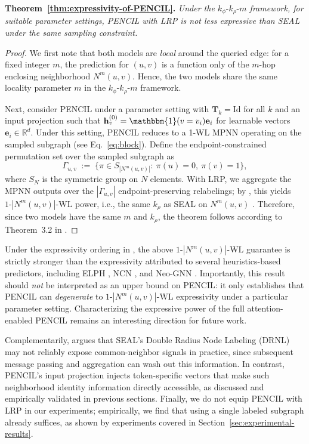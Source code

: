 \documentclass{article}
\theoremstyle{plain}
\theoremstyle{definition}
\theoremstyle{remark}
\begin{document}
\textbf{Theorem~\ref{thm:expressivity-of-PENCIL}.} \textit{
    Under the \(k_\phi\text{-}k_\rho\text{-}m\) framework, for suitable parameter settings, PENCIL with LRP is not less expressive than SEAL under the same sampling constraint.}
\begin{proof}
    We first note that both models are \emph{local} around the queried edge: for a fixed integer \(m\), the prediction for \((u,v)\) is a function only of the \(m\)-hop enclosing neighborhood \(N^m(u,v)\). Hence, the two models share the same locality parameter \(m\) in the \(k_\phi\text{-}k_\rho\text{-}m\) framework.
    
    Next, consider PENCIL under a parameter setting with \(\mathbf{T}_k=\mathrm{Id}\) for all \(k\) and an input projection such that
    \(\mathbf{h}_v^{(0)}=\mathbbm{1}(v=v_i)\mathbf{e}_i\) for learnable vectors \(\mathbf{e}_i\in\mathbb{R}^d\). Under this setting, PENCIL reduces to a 1-WL MPNN operating on the sampled subgraph (see Eq.~\ref{eq:block}). Define the endpoint-constrained permutation set over the sampled subgraph as
    \[
    \Gamma_{u,v} \;:=\; \{\pi\in S_{|N^m(u,v)|}:\ \pi(u)=0,\ \pi(v)=1\},
    \]
    where \(S_N\) is the symmetric group on \(N\) elements. With LRP, we aggregate the MPNN outputs over the \(|\Gamma_{u,v}|\) endpoint-preserving relabelings; by \cite{zhou_relational_2023}, this yields \(1\text{-}|N^m(u,v)|\text{-WL}\) power, i.e., the same \(k_\rho\) as SEAL on \(N^m(u,v)\) \cite{lachi2025bridgingtheorypracticelink}. Therefore, since two models have the same \(m\) and \(k_\rho\), the theorem follows according to Theorem~3.2 in \cite{lachi2025bridgingtheorypracticelink}.
\end{proof}

Under the expressivity ordering in \cite{lachi2025bridgingtheorypracticelink}, the above \(1\text{-}|N^m(u,v)|\text{-WL}\) guarantee is strictly stronger than the expressivity attributed to several heuristics-based predictors, including ELPH \cite{chamberlain2023graph}, NCN \cite{wang2024neural}, and Neo-GNN \cite{yun_neo-gnns_2021}. Importantly, this result should \emph{not} be interpreted as an upper bound on PENCIL: it only establishes that PENCIL can \emph{degenerate} to \(1\text{-}|N^m(u,v)|\text{-WL}\) expressivity under a particular parameter setting. Characterizing the expressive power of the full attention-enabled PENCIL remains an interesting direction for future work.

Complementarily, \cite{liang_can_2025} argues that SEAL's Double Radius Node Labeling (DRNL) may not reliably expose common-neighbor signals in practice, since subsequent message passing and aggregation can wash out this information. In contrast, PENCIL's input projection injects token-specific vectors that make such neighborhood identity information directly accessible, as discussed and empirically validated in previous sections. Finally, we do not equip PENCIL with LRP in our experiments; empirically, we find that using a single labeled subgraph already suffices, as shown by experiments covered in Section~\ref{sec:experimental-results}.
\end{document}
